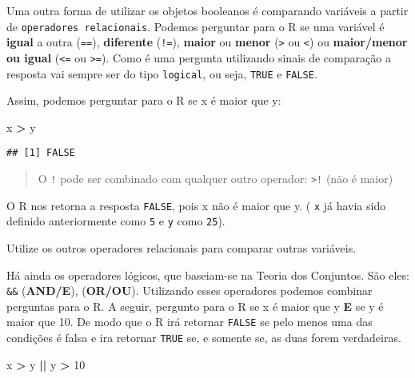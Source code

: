 \documentclass[]{book}
\newenvironment{Shaded}{\begin{snugshade}}{\end{snugshade}}
\newcommand{\DecValTok}[1]{\textcolor[rgb]{0.00,0.00,0.81}{#1}}
\newcommand{\NormalTok}[1]{#1}
\newcommand{\OperatorTok}[1]{\textcolor[rgb]{0.81,0.36,0.00}{\textbf{#1}}}
\newcommand{\StringTok}[1]{\textcolor[rgb]{0.31,0.60,0.02}{#1}}
\theoremstyle{definition}
\theoremstyle{definition}
\theoremstyle{definition}
\theoremstyle{remark}
\let\BeginKnitrBlock\begin \let\EndKnitrBlock\end
\begin{document}
Uma outra forma de utilizar os objetos booleanos é comparando variáveis a partir de \texttt{operadores\ relacionais}. Podemos perguntar para o R se uma variável é \textbf{igual} a outra (\texttt{==}), \textbf{diferente} (\texttt{!=}), \textbf{maior} ou \textbf{menor} (\texttt{\textgreater{}} ou \texttt{\textless{}}) ou \textbf{maior/menor ou igual} (\texttt{\textless{}=} ou \texttt{\textgreater{}=}). Como é uma pergunta utilizando sinais de comparação a resposta vai sempre ser do tipo \texttt{logical}, ou seja, \texttt{TRUE} e \texttt{FALSE}.

Assim, podemos perguntar para o R se x é maior que y:

\begin{Shaded}
\begin{Highlighting}[]
\NormalTok{x }\OperatorTok{>}\StringTok{ }\NormalTok{y}
\end{Highlighting}
\end{Shaded}

\begin{verbatim}
## [1] FALSE
\end{verbatim}

\begin{quote}
O \texttt{!} pode ser combinado com qualquer outro operador: \texttt{\textgreater{}!} (não é maior)
\end{quote}

O R nos retorna a resposta \texttt{FALSE}, pois x não é maior que y. ( \texttt{x} já havia sido definido anteriormente como \texttt{5} e \texttt{y} como \texttt{25}).

\BeginKnitrBlock{exercise}
\protect\hypertarget{exr:unnamed-chunk-15}{}{\label{exr:unnamed-chunk-15} }Utilize os outros operadores relacionais para comparar outras variáveis.
\EndKnitrBlock{exercise}

Há ainda os operadores lógicos, que baseiam-se na Teoria dos Conjuntos. São eles: \texttt{\&\&} (\textbf{AND/E}), \texttt{\textbar{}\textbar{}} (\textbf{OR/OU}). Utilizando esses operadores podemos combinar perguntas para o R. A seguir, pergunto para o R se x é maior que y \textbf{E} se y é maior que 10. De modo que o R irá retornar \texttt{FALSE} se pelo menos uma das condições é {falsa} e ira retornar \texttt{TRUE} se, e somente se, as duas forem {verdadeiras}.

\begin{Shaded}
\begin{Highlighting}[]
\NormalTok{x }\OperatorTok{>}\StringTok{ }\NormalTok{y }\OperatorTok{||}\StringTok{ }\NormalTok{y }\OperatorTok{>}\StringTok{ }\DecValTok{10}
\end{Highlighting}
\end{Shaded}
\end{document}
